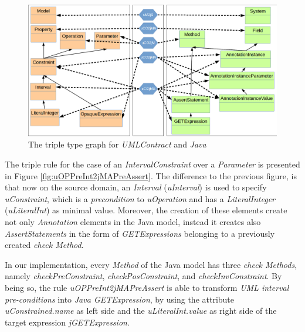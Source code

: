 \documentclass[tuberlin,cic,tc,english,noabntcite]{iiufrgs}
\begin{document}
\begin{figure}[H]
    \caption{The triple type graph for \emph{UMLContract} and \emph{Java}}
    \begin{center}
        \includegraphics[width=.7\textwidth]{umlContract2java_type}
    \end{center}
    \label{fig:umlContract2java_type}
\end{figure}

The triple rule for the case of an \emph{IntervalConstraint} over a \emph{Parameter} is presented in Figure \ref{fig:uOPPreInt2jMAPreAssert}. The difference to the previous figure, is that now on the source domain, an \emph{Interval} (\emph{uInterval}) is used to specify \emph{uConstraint}, which is a \emph{precondition} to \emph{uOperation} and has a \emph{LiteralInteger} (\emph{uLiteralInt}) as minimal value. Moreover, the creation of these elements create not only \emph{Annotation} elements in the Java model, instead it creates also \emph{AssertStatements} in the form of \emph{GETExpressions} belonging to a previously created \emph{check Method}. 

In our implementation, every \emph{Method} of the Java model has three \emph{check Methods}, namely \emph{checkPreConstraint}, \emph{checkPosConstraint}, and \emph{checkInvConstraint}. By being so, the rule \emph{uOPPreInt2jMAPreAssert} is able to transform \emph{UML interval pre-conditions} into \emph{Java GETExpression}, by using the attribute \emph{uConstrained.name} as left side and the \emph{uLiteralInt.value} as right side of the target expression \emph{jGETExpression}.
\end{document}
